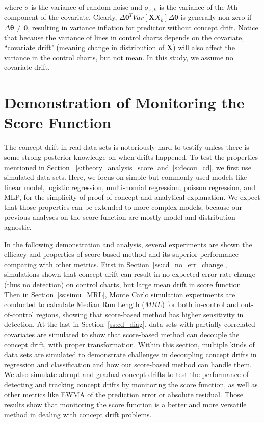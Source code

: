 \documentclass[twoside,11pt]{article}
\begin{document}
where $ \sigma$ is the variance of random noise and $ \sigma _{x,k}$ is the variance of the $k$th component of the covariate. Clearly, $\Delta \bm{\theta}^TVar [\bm {X}  X_{k}]\Delta \bm{\theta}$ is generally non-zero if $ \Delta \bm { \theta} \neq \bm {0}$, resulting in variance inflation for predictor without concept drift. Notice that because the variance of lines in control charts depends on the covariate, ``covariate drift" (meaning change in distribution of $\bm {X}$) will also affect the variance in the control charts, but not mean. In this study, we assume no covariate drift.

\section{Demonstration of Monitoring the Score Function}
\label{s:demon_cd}
The concept drift in real data sets is notoriously hard to testify unless there is some strong posterior knowledge on when drifts happened. To test the properties mentioned in Section ~\ref{s:theory_analysis_score} and~\ref{s:decou_cd}, we first use simulated data sets. Here, we focus on simple but commonly used models like linear model, logistic regression, multi-nomial regression, poisson regression, and MLP, for the simplicity of proof-of-concept and analytical explanation. We expect that those properties can be extended to more complex models, because our previous analyses on the score function are mostly model and distribution agnostic. 

In the following demonstration and analysis, several experiments are shown the efficacy and properties of score-based method and its superior performance comparing with other metrics. First in Section~\ref{ss:cd_no_err_change}, simulations shown that concept drift can result in no expected error rate change (thus no detection) on control charts, but large mean drift in score function. Then in Section~\ref{ss:simu_MRL}, Monte Carlo simulation experiments are conducted to calculate Median Run Length ($MRL$) for both in-control and out-of-control regions, showing that score-based method has higher sensitivity in detection. At the last in Section~\ref{ss:cd_diag}, data sets with partially correlated covariates are simulated to show that score-based method can decouple the concept drift, with proper transformation. Within this section, multiple kinds of data sets are simulated to demonstrate challenges in decoupling concept drifts in regression and classification and how our score-based method can handle them. 
We also simulate abrupt and gradual concept drifts to test the performance of detecting and tracking concept drifts by monitoring the score function, as well as other metrics like EWMA of the prediction error or absolute residual. Those results show that monitoring the score function is a better and more versatile method in dealing with concept drift problems. 
\end{document}
